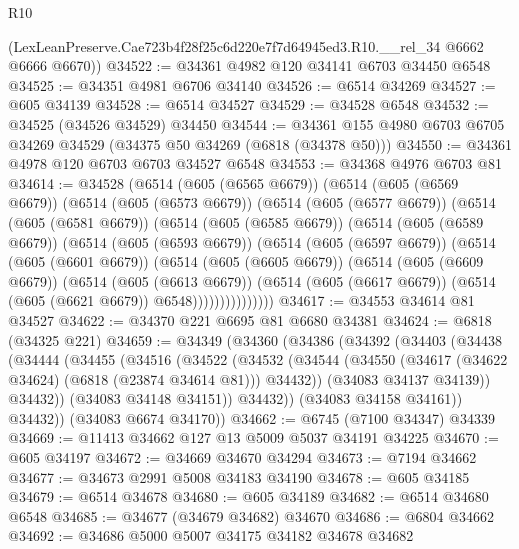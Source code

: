 \begin{lexlean}{R10}
\begin{coremodule}
      (LexLeanPreserve.Cae723b4f28f25c6d220e7f7d64945ed3.R10.__rel_34 @6662 @6666 @6670))
@34522 := @34361 @4982 @120 @34141 @6703 @34450 @6548
@34525 := @34351 @4981 @6706 @34140
@34526 := @6514 @34269
@34527 := @605 @34139
@34528 := @6514 @34527
@34529 := @34528 @6548
@34532 := @34525 (@34526 @34529) @34450
@34544 := @34361 @155 @4980 @6703 @6705 @34269 @34529 (@34375 @50 @34269 (@6818 (@34378 @50)))
@34550 := @34361 @4978 @120 @6703 @6703 @34527 @6548
@34553 := @34368 @4976 @6703 @81
@34614 := @34528
    (@6514
      (@605 (@6565 @6679))
      (@6514
        (@605 (@6569 @6679))
        (@6514
          (@605 (@6573 @6679))
          (@6514
            (@605 (@6577 @6679))
            (@6514
              (@605 (@6581 @6679))
              (@6514
                (@605 (@6585 @6679))
                (@6514
                  (@605 (@6589 @6679))
                  (@6514
                    (@605 (@6593 @6679))
                    (@6514
                      (@605 (@6597 @6679))
                      (@6514
                        (@605 (@6601 @6679))
                        (@6514
                          (@605 (@6605 @6679))
                          (@6514
                            (@605 (@6609 @6679))
                            (@6514
                              (@605 (@6613 @6679))
                              (@6514
                                (@605 (@6617 @6679))
                                (@6514 (@605 (@6621 @6679)) @6548)))))))))))))))
@34617 := @34553 @34614 @81 @34527
@34622 := @34370 @221 @6695 @81 @6680 @34381
@34624 := @6818 (@34325 @221)
@34659 := @34349
    (@34360
      (@34386
        (@34392
          (@34403
            (@34438
              (@34444
                (@34455
                  (@34516
                    (@34522
                      (@34532
                        (@34544
                          (@34550 (@34617 (@34622 @34624) (@6818 (@23874 @34614 @81))) @34432))
                        (@34083 @34137 @34139))
                      @34432))
                  (@34083 @34148 @34151))
                @34432))
            (@34083 @34158 @34161))
          @34432))
      (@34083 @6674 @34170))
@34662 := @6745 (@7100 @34347) @34339
@34669 := @11413 @34662 @127 @13 @5009 @5037 @34191 @34225
@34670 := @605 @34197
@34672 := @34669 @34670 @34294
@34673 := @7194 @34662
@34677 := @34673 @2991 @5008 @34183 @34190
@34678 := @605 @34185
@34679 := @6514 @34678
@34680 := @605 @34189
@34682 := @6514 @34680 @6548
@34685 := @34677 (@34679 @34682) @34670
@34686 := @6804 @34662
@34692 := @34686 @5000 @5007 @34175 @34182 @34678 @34682

\end{coremodule}
\end{lexlean}
